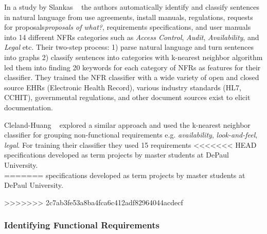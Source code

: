 	In a study by Slankas \etal~\cite{Slankas:2013} the authors automatically
identify and classify sentences in natural language from use agreements, install
manuals, regulations, requests for proposals\emph{proposals of what?},
requirements specifications, and user manuals into 14 different NFRs categories such as 
\emph{Access Control}, \emph{Audit}, \emph{Availability},  and \emph{Legal} etc.
Their two-step process: 1) parse natural language and turn sentences into graphs
2) classify sentences into categories with k-nearest neighbor algorithm led them
into finding 20 keywords for each category of NFRs as features for their
classifier. They trained the NFR classifier
with a wide variety of open and closed source EHRs (Electronic Health Record),
various industry standards (HL7, CCHIT), governmental regulations, and other
document sources exist to elicit documentation.

 	Cleland-Huang \etal~\cite{Cleland-Huang2007} explored a similar approach and
used the k-nearest neighbor classifier for grouping non-functional requirements e.g.
\emph{availability}, \emph{look-and-feel}, \emph{legal}. For training their classifier they used 15 requirements
<<<<<<< HEAD
specifications developed as term projects by master students at DePaul University.\\
=======
specifications developed as term projects by master students at DePaul University.

>>>>>>> 2c7ab3fe53a8ba4fca6c412adf82964044acdecf
\subsubsection{Identifying Functional Requirements}

